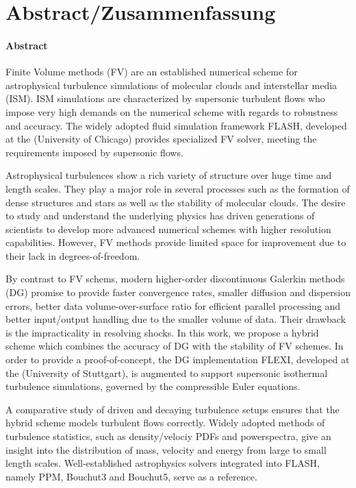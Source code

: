 \section*{Abstract/Zusammenfassung}
\paragraph{Abstract}
Finite Volume methods (FV) are an established numerical scheme for
astrophysical turbulence simulations of molecular clouds and interstellar media
(ISM). ISM simulations are characterized by supersonic turbulent flows who 
impose very high demands on the numerical scheme with regards to robustness and
accuracy. The widely adopted fluid simulation framework FLASH, developed at the
 (University of Chicago) provides
specialized FV solver, meeting the requirements imposed by supersonic flows.

Astrophysical turbulences show a rich variety of structure over huge time and
length scales. They play a major role in several processes such as the
formation of dense structures and stars as well as the stability of molecular
clouds. The desire to study and understand the underlying physics has driven
generations of scientists to develop more advanced numerical schemes with
higher resolution capabilities. However, FV methods provide limited space for
improvement due to their lack in degrees-of-freedom.

By contrast to FV schems, modern higher-order discontinuous Galerkin methods
(DG) promise to provide faster convergence rates, smaller diffusion and
dispersion errors, better data volume-over-surface ratio for efficient parallel
processing and better input/output handling due to the smaller volume of data.
Their drawback is the impracticality in resolving shocks. In this work, we
propose a hybrid scheme which combines the accuracy of DG with the stability of
FV schemes. In order to provide a proof-of-concept, the DG implementation
FLEXI, developed at the 
(University of Stuttgart), is augmented to support supersonic isothermal
turbulence simulations, governed by the compressible Euler equations.

A comparative study of driven and decaying turbulence setups ensures that the
hybrid scheme models turbulent flows correctly. Widely adopted methods of
turbulence statistics, such as density/velociy PDFs and powerspectra, give an
insight into the distribution of mass, velocity and energy from large to small
length scales. Well-established astrophysics solvers integrated into FLASH,
namely PPM, Bouchut3 and Bouchut5, serve as a reference.

